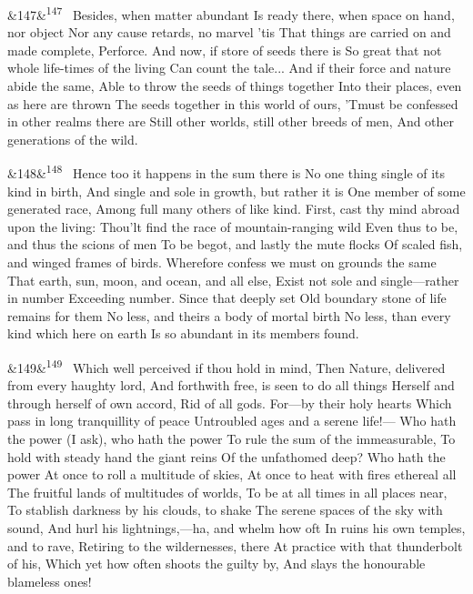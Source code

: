 \documentclass[12pt]{article}
\newcommand{\para}[1][]{\par\noindent\ifx&#1&\else\textsuperscript{\footnotesize #1}~\fi}
\begin{document}
\para[147] Besides, when matter abundant Is ready there, when space on hand, nor object Nor any cause retards, no marvel 'tis That things are carried on and made complete, Perforce. And now, if store of seeds there is So great that not whole life-times of the living Can count the tale... And if their force and nature abide the same, Able to throw the seeds of things together Into their places, even as here are thrown The seeds together in this world of ours, 'Tmust be confessed in other realms there are Still other worlds, still other breeds of men, And other generations of the wild.

\para[148] Hence too it happens in the sum there is No one thing single of its kind in birth, And single and sole in growth, but rather it is One member of some generated race, Among full many others of like kind. First, cast thy mind abroad upon the living: Thou'lt find the race of mountain-ranging wild Even thus to be, and thus the scions of men To be begot, and lastly the mute flocks Of scaled fish, and winged frames of birds. Wherefore confess we must on grounds the same That earth, sun, moon, and ocean, and all else, Exist not sole and single---rather in number Exceeding number. Since that deeply set Old boundary stone of life remains for them No less, and theirs a body of mortal birth No less, than every kind which here on earth Is so abundant in its members found.

\para[149] Which well perceived if thou hold in mind, Then Nature, delivered from every haughty lord, And forthwith free, is seen to do all things Herself and through herself of own accord, Rid of all gods. For---by their holy hearts Which pass in long tranquillity of peace Untroubled ages and a serene life!--- Who hath the power (I ask), who hath the power To rule the sum of the immeasurable, To hold with steady hand the giant reins Of the unfathomed deep? Who hath the power At once to roll a multitude of skies, At once to heat with fires ethereal all The fruitful lands of multitudes of worlds, To be at all times in all places near, To stablish darkness by his clouds, to shake The serene spaces of the sky with sound, And hurl his lightnings,---ha, and whelm how oft In ruins his own temples, and to rave, Retiring to the wildernesses, there At practice with that thunderbolt of his, Which yet how often shoots the guilty by, And slays the honourable blameless ones!
\end{document}
